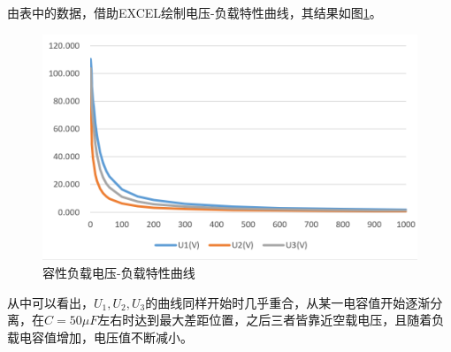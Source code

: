 \documentclass[12pt]{article}%
\begin{document}
由表中的数据，借助EXCEL绘制电压-负载特性曲线，其结果如图\ref{fig:a121o}。\par
\begin{figure}[htbp]
\centering\includegraphics[width=0.8\linewidth]{TIM20180601004549.png}
\caption{\heiti{}容性负载电压-负载特性曲线}\label{fig:a121o}
\end{figure}
从中可以看出，$U_1,U_2,U_3$的曲线同样开始时几乎重合，从某一电容值开始逐渐分离，在$C=50\mu F$左右时达到最大差距位置，之后三者皆靠近空载电压，且随着负载电容值增加，电压值不断减小。
\end{document}
